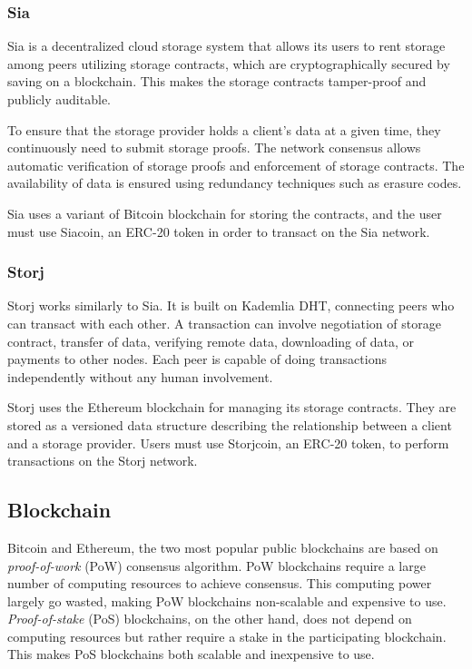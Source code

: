 \subsubsection{Sia}
Sia\cite{vorick2014sia} is a decentralized cloud storage system that allows its users to rent storage among peers utilizing storage contracts, which are cryptographically secured by saving on a blockchain. This makes the storage contracts tamper-proof and publicly auditable.

To ensure that the storage provider holds a client's data at a given time, they continuously need to submit storage proofs. The network consensus allows automatic verification of storage proofs and enforcement of storage contracts. The availability of data is ensured using redundancy techniques such as erasure codes.

Sia uses a variant of Bitcoin blockchain for storing the contracts, and the user must use Siacoin, an ERC-20 token in order to transact on the Sia network.

\subsubsection{Storj}
Storj\cite{wilkinson2014storj} works similarly to Sia. It is built on Kademlia\cite{maymounkov2002kademlia} DHT, connecting peers who can transact with each other. A transaction can involve negotiation of storage contract, transfer of data, verifying remote data, downloading of data, or payments to other nodes. Each peer is capable of doing transactions independently without any human involvement.

Storj uses the Ethereum blockchain for managing its storage contracts. They are stored as a versioned data structure describing the relationship between a client and a storage provider. Users must use Storjcoin, an ERC-20 token, to perform transactions on the Storj network.

\subsection{Blockchain}
Bitcoin\cite{nakamoto2008bitcoin} and Ethereum\cite{buterin2014ethereum}, the two most popular public blockchains are based on \textit{proof-of-work} (PoW)\cite{wiki:pow} consensus algorithm. PoW blockchains require a large number of computing resources to achieve consensus. This computing power largely go wasted, making PoW blockchains non-scalable and expensive to use. \textit{Proof-of-stake} (PoS)\cite{wiki:pos} blockchains, on the other hand, does not depend on computing resources but rather require a stake in the participating blockchain. This makes PoS blockchains both scalable and inexpensive to use.

